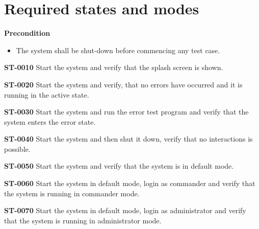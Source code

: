 \section{Required states and modes}
\textbf{Precondition}
\begin{itemize}
\item The system shall be shut-down before commencing any test case. \\
\end{itemize}


\begin{description}

\item\textbf{ST-0010} Start the system and verify that the splash screen is shown. 
\item\textbf{ST-0020} Start the system and verify, that no errors have occurred and it is running in the active state.
\item\textbf{ST-0030} Start the system and run the error test program and verify that the system enters the error state.  
\item\textbf{ST-0040} Start the system and then shut it down, verify that no interactions is possible. 
	

\item\textbf{ST-0050} Start the system and verify that the system is in default mode. 
\item\textbf{ST-0060} Start the system in default mode, login as commander and verify that the system is running in commander mode.
\item\textbf{ST-0070} Start the system in default mode, login as administrator and verify that the system is running in administrator mode.

\end{description}